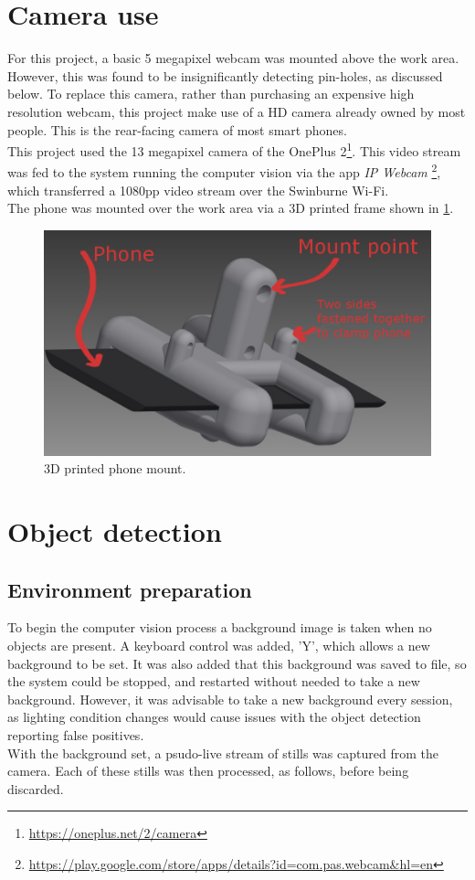\documentclass[11pt,a4paper, margin=1in]{report}
\begin{document}
\section{Camera use}
For this project, a basic 5 megapixel webcam was mounted above the work area. However, this was found to be insignificantly detecting pin-holes, as discussed below. To replace this camera, rather than purchasing an expensive high resolution webcam, this project make use of a HD camera already owned by most people. This is the rear-facing camera of most smart phones.\\
This project used the 13 megapixel camera of the OnePlus 2\footnote{\url{https://oneplus.net/2/camera}}. This video stream was fed to the system running the computer vision via the app \textit{IP Webcam} \footnote{\url{https://play.google.com/store/apps/details?id=com.pas.webcam&hl=en}}, which transferred a 1080pp video stream over the Swinburne Wi-Fi.\\ The phone was mounted over the work area via a 3D printed frame shown in  \cref{fig:mount}.
\begin{figure}[h]
	\centering
	\includegraphics[width=0.7\linewidth]{mount}
	\caption{3D printed phone mount.}
	\label{fig:mount}
\end{figure}

\section{Object detection}
\subsection{Environment preparation}
To begin the computer vision process a background image is taken when no objects are present. A keyboard control was added, 'Y', which allows a new background to be set. %
It was also added that this background was saved to file, so the system could be stopped, and restarted without needed to take a new background. However, it was advisable to take a new background every session, as lighting condition changes would cause issues with the object detection reporting false positives.\\
With the background set, a psudo-live stream of stills was captured from the camera. Each of these stills was then processed, as follows, before being discarded. 
\end{document}
